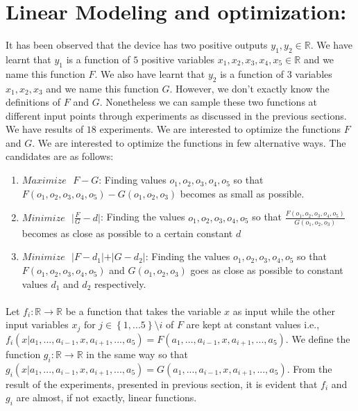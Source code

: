 \documentclass[12pt]{article}
\begin{document}
\maketitle
\section{Linear Modeling and optimization:}
It has been observed that the device has two positive outputs $y_1,y_2 \in \mathbb{R}$. We have learnt that $y_1$ is a function of $5$ positive variables $x_1,x_2,x_3,x_4,x_5 \in \mathbb{R}$ and we name this function $F$. We also have learnt that $y_2$ is a function of $3$ variables $x_1,x_2,x_3$ and we name this function $G$. However, we don't exactly know the definitions of $F$ and $G$. Nonetheless we can sample these two functions at different input points through experiments as discussed in the previous sections. We have results of $18$ experiments. We are interested to optimize the functions $F$ and $G$. We are interested to optimize the functions in few alternative ways. The candidates are as follows:
\begin{enumerate}
\item $Maximize \text{ }F - G$: Finding values $o_1,o_2,o_3,o_4,o_5$ so that $F(o_1,o_2,o_3,o_4,o_5) - G(o_1,o_2,o_3)$ becomes as small as possible.
\item $Minimize \text{ } \vert\frac{F}{G}-d\vert$: Finding the values $o_1,o_2,o_3,o_4,o_5$ so that $\frac{F(o_1,o_2,o_3,o_4,o_5)}{G(o_1,o_2,o_3)}$ becomes as close as possible to a certain constant $d$
\item $Minimize \text{ } \vert F-d_1 \vert + \vert G-d_2 \vert$: Finding the values $o_1,o_2,o_3,o_4,o_5$ so that $F(o_1,o_2,o_3,o_4,o_5)$ and $G(o_1,o_2,o_3)$  goes as close as possible to constant values $d_1$ and $d_2$ respectively.
\end{enumerate}
\paragraph{}
Let $f_i:\mathbb{R} \rightarrow \mathbb{R}$ be a function that takes the variable $x$ as input while the other input variables $x_{j} \text{ for } j \in \left\lbrace1,...5\right\rbrace\setminus{i}$ of $F$ are kept at constant values i.e., $f_i(x\vert a_1,...,a_{i-1},x,a_{i+1},...,a_{5}) = F(a_1,...,a_{i-1},x,a_{i+1},...,a_{5})$. We define the function $g_i:\mathbb{R} \rightarrow \mathbb{R}$ in the same way so that $g_i(x\vert a_1,...,a_{i-1},x,a_{i+1},...,a_{5}) = G(a_1,...,a_{i-1},x,a_{i+1},...,a_{5})$. From the result of the experiments, presented in previous section, it is evident that $f_i$ and  $g_i$ are almost, if not exactly, linear functions.
\end{document}
